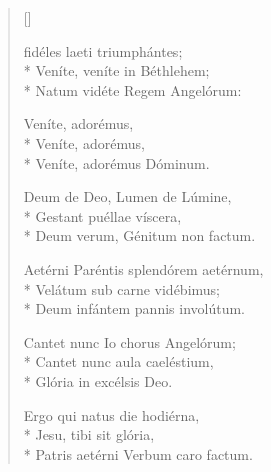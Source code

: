\newHymn


\begin{verse}[\versewidth]

 fidéles laeti triumphántes;\\*
Veníte, veníte 
in Béthlehem;\\*
Natum vidéte Regem Angelórum:       
\pointtrans

\begin{indentedVerse}
\vin Veníte, adorémus,\\*
\vin Veníte, adorémus,\\*
\vin Veníte, adorémus Dóminum.
\end{indentedVerse}

Deum de Deo, Lumen de Lúmine,\\*
Gestant puéllae     
víscera,\\*
Deum verum, Génitum non factum. 
 



Aetérni Paréntis splendórem aetérnum,\\*
Velátum sub 
carne vidébimus;\\*
Deum infántem pannis involútum.  



Cantet nunc Io chorus Angelórum;\\*
Cantet nunc aula 
caeléstium,\\*
Glória in excélsis Deo.



Ergo qui natus die hodiérna,\\*
Jesu, tibi sit       
glória,\\*
Patris aetérni Verbum caro factum.

\end{verse}


